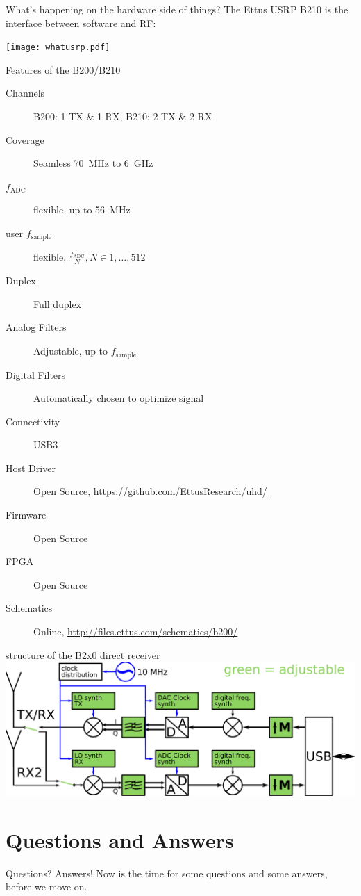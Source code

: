 \documentclass{beamer}
\begin{document}
\begin{frame}{What's happening on the hardware side of things?}
  The Ettus USRP B210 is the interface between software and RF:\bigskip


  \texttt{[image: whatusrp.pdf]}
\end{frame}
\begin{frame}{Features of the B200/B210}
\begin{description}
  \item[Channels] B200: 1 TX \& 1 RX, B210: 2 TX \& 2 RX
  \item[Coverage] Seamless \SI{70}{\mega\hertz} to \SI{6}{\giga\hertz}
  \item[$f_\text{ADC}$] flexible, up to \SI{56}{\mega\hertz}
  \item[user $f_\text{sample}$] flexible, $\frac{f_\text{ADC}}{N}, N \in 1,\dots,512$
  \item[Duplex] Full duplex
  \item[Analog Filters] Adjustable, up to $f_\text{sample}$
  \item[Digital Filters] Automatically chosen to optimize signal
  \item[Connectivity] USB3
  \item[Host Driver] Open Source, \url{https://github.com/EttusResearch/uhd/}
  \item[Firmware] Open Source
  \item[FPGA] Open Source
  \item[Schematics] Online, \url{http://files.ettus.com/schematics/b200/}
\end{description}
\end{frame}
\begin{frame}{structure of the B2x0 direct receiver}
\includegraphics[width=\textwidth]{b200.pdf}
\end{frame}

\section{Questions and Answers}
\begin{frame}{Questions? Answers!}
  Now is the time for some questions and some answers, before we move on.
\end{frame}
\end{document}
